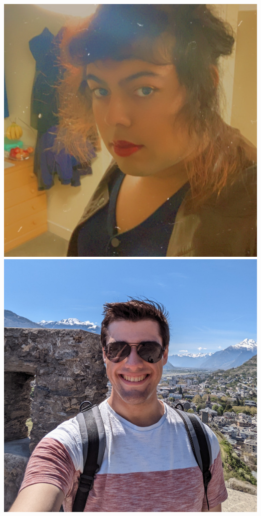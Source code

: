 \documentclass[aspectratio=169]{beamer}
\begin{document}
\begin{frame}
{            \includegraphics[width=0.09\textheight]{figures/students/felicity_ibrahim.jpg}%
            \includegraphics[width=0.09\textheight]{figures/students/george_carter.jpg}%
}
\end{frame}
\end{document}
